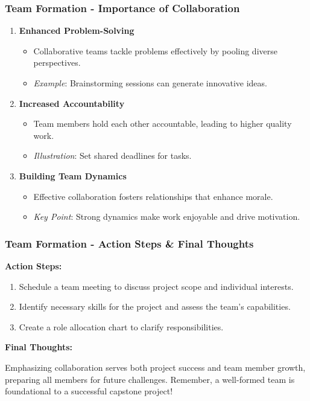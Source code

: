 \documentclass[aspectratio=169]{beamer}
\begin{document}
\begin{frame}[fragile]
    \frametitle{Team Formation - Importance of Collaboration}

    \begin{enumerate}
        \item \textbf{Enhanced Problem-Solving}
        \begin{itemize}
            \item Collaborative teams tackle problems effectively by pooling diverse perspectives.
            \item \textit{Example}: Brainstorming sessions can generate innovative ideas.
        \end{itemize}

        \item \textbf{Increased Accountability}
        \begin{itemize}
            \item Team members hold each other accountable, leading to higher quality work.
            \item \textit{Illustration}: Set shared deadlines for tasks.
        \end{itemize}

        \item \textbf{Building Team Dynamics}
        \begin{itemize}
            \item Effective collaboration fosters relationships that enhance morale.
            \item \textit{Key Point}: Strong dynamics make work enjoyable and drive motivation.
        \end{itemize}
    \end{enumerate}
\end{frame}

\begin{frame}[fragile]
    \frametitle{Team Formation - Action Steps & Final Thoughts}

    \textbf{Action Steps:}
    \begin{enumerate}
        \item Schedule a team meeting to discuss project scope and individual interests.
        \item Identify necessary skills for the project and assess the team’s capabilities.
        \item Create a role allocation chart to clarify responsibilities.
    \end{enumerate}

    \textbf{Final Thoughts:}
    \begin{block}{}
        Emphasizing collaboration serves both project success and team member growth, preparing all members for future challenges. Remember, a well-formed team is foundational to a successful capstone project!
    \end{block}
\end{frame}
\end{document}
